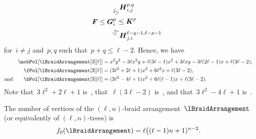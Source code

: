\begin{example}
\[
\b{F} \le \b{G}_i^p \hspace{-.4cm} \begin{array}{l} \rotatebox[origin=c]{45}{$\le$} \raisebox{.2cm}{$\b{H}_{i,j}^{p,q}$} \\[.1cm] \quad \le \b{K}^p \\[.1cm] \rotatebox[origin=c]{-45}{$\le$} \raisebox{-.2cm}{$\b{H}_{j,i}^{\ell-q-1, \ell-p-1}$} \end{array}
\]
for~$i \ne j$ and~$p, q$ such that~$p + q \le \ell-2$.
Hence, we have
\begin{align*}
\mobPol[{\lBraidArrangement[3][\ell]}] & = x^2 y^2 - 3 \ell x^2 y + \ell (3 \ell - 1) x^2 + 3 \ell x y - 3 \ell (2 \ell - 1) x + \ell (3 \ell - 2) , \\
\fPol[{\lBraidArrangement[3][\ell]}] & = (3 \ell^2 + 2 \ell + 1) x^2 + 6 \ell^2 x + \ell (3 \ell - 2), \\
\text{and}\qquad
\bPol[{\lBraidArrangement[3][\ell]}] & = (3 \ell^2 - 4 \ell + 1) x^2 + 6 \ell (\ell - 1) x + \ell (3 \ell - 2).
\end{align*}
Note that~$3 \ell^2 + 2 \ell + 1$ is~, that~$\ell (3 \ell - 2)$ is~, and that~$3 \ell^2 - 4 \ell + 1$ is~.
\end{example}

\begin{theorem}
\label{thm:verticeslnBraidArrangement}
The number of vertices of the $(\ell,n)$-braid arrangement~$\lBraidArrangement$ (or equivalently of $(\ell,n)$-trees) is
\[
f_0(\lBraidArrangement) = \ell \big( (\ell-1) n + 1)^{n-2}.
\]
\end{theorem}

